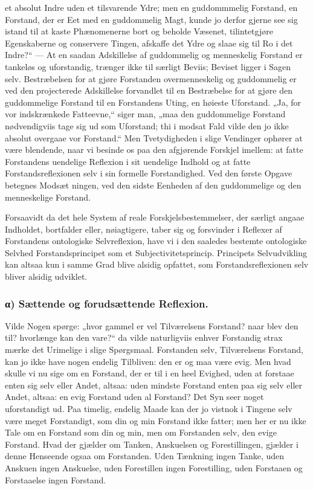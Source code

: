 \documentclass[11pt]{book}
\newcommand{\opage}[1]{\marginnote{\footnotesize\textit{[#1]}}}
\begin{document}
et absolut Indre uden et tilsvarende Ydre; men en guddommmelig Forstand, en
Forstand, der er Eet med en guddommelig Magt, kunde jo derfor gjerne see
sig istand til at kaste Phænomenerne bort og beholde Væsenet,
tilintetgjøre Egenskaberne og conservere Tingen, afskaffe det Ydre og slaae
sig til Ro i det Indre?“ --- At en saadan Adskillelse af guddommelig og
menneskelig Forstand er tankeløs og uforstandig, trænger ikke til særligt
Beviis; Beviset ligger i Sagen selv. Bestræbelsen for at gjøre Forstanden
overmenneskelig og guddommelig er ved den projecterede Adskillelse
forvandlet til en Bestræbelse for at gjøre den guddommelige Forstand til en
Forstandens Uting, en høieste Uforstand. „Ja, for vor indskrænkede
Fatteevne,“ siger man, „maa den guddommelige Forstand nødvendigviis tage
sig ud som Uforstand; thi i modsat Fald vilde den jo ikke absolut overgaae
vor Forstand.“ Men Tvetydigheden i slige Vendinger ophører at være
blendende, naar vi besinde os paa den afgjørende Forskjel imellem: at fatte
Forstandens uendelige Reflexion i sit uendelige Indhold og at fatte
Forstandsreflexionen selv i sin formelle Forstandighed. Ved den første
Opgave betegnes Modsæt\-%
\opage{62} \setcounter{footnote}{0}%
ningen, ved den sidste Eenheden af den guddommelige og den menneskelige
Forstand.

Forsaavidt da det hele System af reale Forskjelsbestemmelser, der særligt
angaae Indholdet, bortfalder eller, nøiagtigere, taber sig og forsvinder i
Reflexer af Forstandens ontologiske Selvreflexion, have vi i den saaledes
bestemte ontologiske Selvhed Forstandsprincipet som et
Subjectivitetsprincip. Principets Selvudvikling kan altsaa kun i samme Grad
blive alsidig opfattet, som Forstandsreflexionen selv bliver alsidig
udviklet.

\subsubsection*{α) Sættende og forudsættende Reflexion.}
Vilde Nogen spørge: „hvor gammel er vel Tilværelsens Forstand? naar blev
den til? hvorlænge kan den vare?“ da vilde naturligviis enhver Forstandig
strax mærke det Urimelige i slige Spørgsmaal. Forstanden selv, Tilværelsens
Forstand, kan jo ikke have nogen endelig Tilbliven: den er og maa være
evig. Men hvad skulle vi nu sige om en Forstand, der er til i en heel
Evighed, uden at forstaae enten sig selv eller Andet, altsaa: uden mindste
Forstand enten paa sig selv eller Andet, altsaa: en evig Forstand uden al
Forstand? Det Syn seer noget uforstandigt ud. Paa timelig, endelig Maade
kan der jo vistnok i Tingene selv være meget Forstandigt, som din og min
Forstand ikke fatter; men her er nu ikke Tale om en Forstand som din og
min, men om Forstanden selv, den evige Forstand. Hvad der gjælder om
Tanken, Anskuelsen og Forestillingen, gjælder i denne Henseende ogsaa om
Forstanden. Uden Tænkning ingen Tanke, uden Anskuen ingen Anskuelse, uden
Forestillen ingen Forestilling, uden Forstaaen og Forstaaelse ingen
Forstand.
\end{document}
